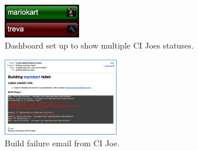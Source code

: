     \begin{figure}
    \centering
    \includegraphics[width=0.3\textwidth]{images/joe-dashboard}
    \caption{Dashboard set up to show multiple CI Joes statuses.}
    \label{joe-dashboard}
    \end{figure}

    \begin{figure}
    \centering
    \includegraphics[width=0.45\textwidth]{images/joe-email}
    \caption{Build failure email from CI Joe.}
    \label{joe-email}
    \end{figure}
